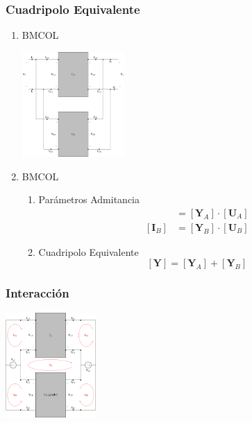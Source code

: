 \subsubsection{Cuadripolo Equivalente}
\label{sec:org0bc310b}
\begin{enumerate}
\item \hfill{}\textsc{BMCOL}
\label{sec:org0d6fdf5}

\includegraphics[height=4cm]{../figs/paralelo-paralelo.pdf}



\item \hfill{}\textsc{BMCOL}
\label{sec:org582370f}
\begin{enumerate}
\item Parámetros Admitancia
\label{sec:org0aeffe8}
\begin{align*}
  [\mathbf{I}_A] &= [\mathbf{Y}_A] \cdot [\mathbf{U}_A]\\
  [\mathbf{I}_B] &= [\mathbf{Y}_B] \cdot [\mathbf{U}_B]
\end{align*}

\item Cuadripolo Equivalente
\label{sec:orgdcc9958}
\[
  \boxed{[\mathbf{Y}] = [\mathbf{Y}_A] + [\mathbf{Y}_B]}
\]
\end{enumerate}
\end{enumerate}
\subsubsection{Interacción}
\label{sec:orgd584cd4}

\includegraphics[height=4cm]{../figs/paralelo-paralelo-interaccion.pdf}

